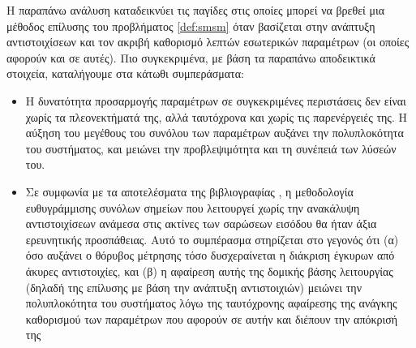 Η παραπάνω ανάλυση καταδεικνύει τις παγίδες στις οποίες μπορεί να βρεθεί μια
μέθοδος επίλυσης του προβλήματος \ref{def:smsm} όταν βασίζεται στην ανάπτυξη
αντιστοιχίσεων και τον ακριβή καθορισμό λεπτών εσωτερικών παραμέτρων (οι οποίες
αφορούν και σε αυτές). Πιο συγκεκριμένα, με βάση τα παραπάνω αποδεικτικά
στοιχεία, καταλήγουμε στα κάτωθι συμπεράσματα:

\begin{itemize}
  \item Η δυνατότητα προσαρμογής παραμέτρων σε συγκεκριμένες περιστάσεις δεν
        είναι χωρίς τα πλεονεκτήματά της, αλλά ταυτόχρονα και χωρίς τις
        παρενέργειές της. Η αύξηση του μεγέθους του συνόλου των παραμέτρων
        αυξάνει την πολυπλοκότητα του συστήματος, και μειώνει την προβλεψιμότητα
        και τη συνέπειά των λύσεών του.

  \item Σε συμφωνία με τα αποτελέσματα της βιβλιογραφίας
        \cite{Donoso2017b,bernreiter2021phaser}, η μεθοδολογία ευθυγράμμισης
        συνόλων σημείων που λειτουργεί χωρίς την ανακάλυψη αντιστοιχίσεων
        ανάμεσα στις ακτίνες των σαρώσεων εισόδου θα ήταν άξια ερευνητικής
        προσπάθειας.  Αυτό το συμπέρασμα στηρίζεται στο γεγονός ότι (α) όσο
        αυξάνει ο θόρυβος μέτρησης τόσο δυσχεραίνεται η διάκριση έγκυρων από
        άκυρες αντιστοιχίες, και (β) η αφαίρεση αυτής της δομικής βάσης
        λειτουργίας (δηλαδή της επίλυσης με βάση την ανάπτυξη αντιστοιχιών)
        μειώνει την πολυπλοκότητα του συστήματος λόγω της ταυτόχρονης αφαίρεσης
        της ανάγκης καθορισμού των παραμέτρων που αφορούν σε αυτήν και
        διέπουν την απόκρισή της
\end{itemize}
